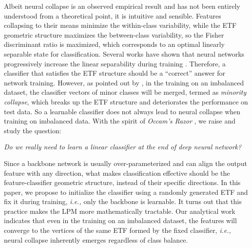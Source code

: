 \documentclass{article}
\newcommand{\<}{\left\langle}
\renewcommand{\>}{\right\rangle}
\begin{document}
Albeit neural collapse is an observed empirical result and has not been entirely understood from a theoretical point, it is intuitive and sensible. Features collapsing to their means minimize the within-class variability, while the ETF geometric structure maximizes the between-class variability, so the Fisher discriminant ratio  \cite{fisher1936use,rao1948utilization} is maximized, which corresponds to an optimal linearly separable state for classification. Several works have shown that neural networks progressively increase the linear separability during training \cite{oyallon2017building,papyan2020traces,zarka2020separation}. Therefore, a classifier that satisfies the ETF structure should be a ``correct'' answer for network training. However, as pointed out by \cite{fang2021exploring}, in the training on an imbalanced dataset, the classifier vectors of minor classes will be merged, termed as \emph{minority collapse}, which breaks up the ETF structure and deteriorates the performance on test data. So a learnable classifier does not always lead to neural collapse when training on imbalanced data. With the spirit of \emph{Occam’s Razor} \cite{smith1980bayes}, we raise and study the question: 

\emph{Do we really need to learn a linear classifier at the end of deep neural network?} 





Since a backbone network is usually over-parameterized and can align the output feature with any direction, what makes classification effective should be the feature-classifier geometric structure, instead of their specific directions. In this paper, we propose to initialize the classifier using a randomly generated ETF and fix it during training, \emph{i.e.,} only the backbone is learnable. It turns out that this practice makes the LPM more mathematically tractable. Our analytical work indicates that even in the training on an imbalanced dataset, the features will converge to the vertices of the same ETF formed by the fixed classifier, \emph{i.e.,} neural collapse inherently emerges regardless of class balance. 
\end{document}
